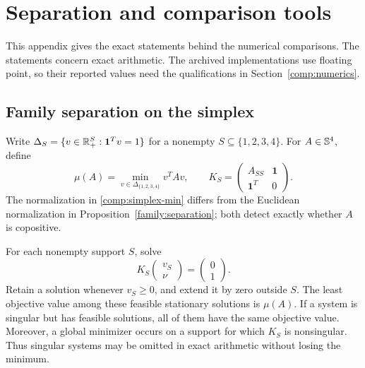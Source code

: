 \section{Separation and comparison tools}
\label{comp:tools}

This appendix gives the exact statements behind the numerical comparisons.
The statements concern exact arithmetic. The archived implementations use
floating point, so their reported values need the qualifications in
Section~\ref{comp:numerics}.

\subsection{Family separation on the simplex}

Write $\Delta_S=\{v\in\mathbb R_+^S:\mathbf1^Tv=1\}$ for a nonempty
$S\subseteq\{1,2,3,4\}$. For $A\in\mathbb S^{4}$, define
\begin{equation}\label{comp:simplex-min}
 \mu(A)=\min_{v\in\Delta_{\{1,2,3,4\}}}v^TAv,
 \qquad
 K_S=\begin{pmatrix}A_{SS}&\mathbf1\\\mathbf1^T&0\end{pmatrix}.
\end{equation}
The normalization in \eqref{comp:simplex-min} differs from the Euclidean
normalization in Proposition~\ref{family:separation}; both detect exactly
whether $A$ is copositive.

\begin{proposition}\label{comp:family-separation}
For each nonempty support $S$, solve
\begin{equation}\label{comp:bordered}
 K_S\begin{pmatrix}v_S\\\nu\end{pmatrix}
   =\begin{pmatrix}0\\1\end{pmatrix}.
\end{equation}
Retain a solution whenever $v_S\geq0$, and extend it by zero outside $S$.
The least objective value among these feasible stationary solutions is
$\mu(A)$. If a system is singular but has feasible solutions, all of them
have the same objective value. Moreover, a global minimizer occurs on a
support for which $K_S$ is nonsingular. Thus singular systems may be omitted
in exact arithmetic without losing the minimum.
\end{proposition}

